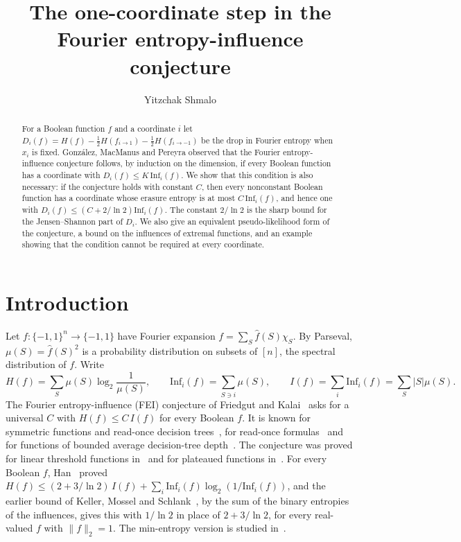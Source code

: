 \documentclass[11pt]{amsart}
\title{The one-coordinate step in the Fourier entropy-influence conjecture}
\author{Yitzchak Shmalo}
\date{}
\theoremstyle{remark}
\newcommand{\Inf}{\mathrm{Inf}}
\begin{document}
\begin{abstract}
For a Boolean function $f$ and a coordinate $i$ let $D_i(f)=H(f)-\tfrac12 H(f_{i\to 1})-\tfrac12 H(f_{i\to -1})$ be the
drop in Fourier entropy when $x_i$ is fixed. Gonz\'alez, MacManus and Pereyra observed that the Fourier
entropy-influence conjecture follows, by induction on the dimension, if every Boolean function has a coordinate
with $D_i(f)\le K\,\Inf_i(f)$. We show that this condition is also necessary: if the conjecture holds with constant
$C$, then every nonconstant Boolean function has a coordinate whose erasure entropy is at most $C\,\Inf_i(f)$, and
hence one with $D_i(f)\le (C+2/\ln 2)\Inf_i(f)$. The constant $2/\ln 2$ is the sharp bound for the Jensen--Shannon
part of $D_i$. We also give an equivalent pseudo-likelihood form of the conjecture, a bound on the influences of
extremal functions, and an example showing that the condition cannot be required at every coordinate.
\end{abstract}


\maketitle

\section{Introduction}\label{sec:intro}

Let $f:\{-1,1\}^n\to\{-1,1\}$ have Fourier expansion $f=\sum_S \hat f(S)\chi_S$. By Parseval, $\mu(S)=\hat f(S)^2$
is a probability distribution on subsets of $[n]$, the spectral distribution of $f$. Write
\[
H(f)=\sum_S \mu(S)\log_2\frac{1}{\mu(S)},\qquad \Inf_i(f)=\sum_{S\ni i}\mu(S),\qquad I(f)=\sum_i \Inf_i(f)=\sum_S|S|\mu(S).
\]
The Fourier entropy-influence (FEI) conjecture of Friedgut and Kalai~\cite{FK96} asks for a universal $C$ with
$H(f)\le C\,I(f)$ for every Boolean $f$. It is known for symmetric functions and read-once decision
trees~\cite{OWZ11}, for read-once formulas~\cite{OT13,CKLS} and for functions of bounded average decision-tree
depth~\cite{WWW14}. The conjecture was proved for linear threshold functions in~\cite{ShmLTF} and for
plateaued functions in~\cite{Pot26}. For every
Boolean $f$, Han~\cite{Han} proved $H(f)\le(2+3/\ln 2)\,I(f)+\sum_i\Inf_i(f)\log_2(1/\Inf_i(f))$, and the earlier
bound of Keller, Mossel and Schlank~\cite[Claim~4.1]{KMS}, by the sum of the binary entropies of the influences, gives this with $1/\ln 2$ in place of
$2+3/\ln 2$, for every real-valued $f$ with $\|f\|_2=1$. The min-entropy version is studied in~\cite{ACKSW,KKLMS}.
\end{document}
